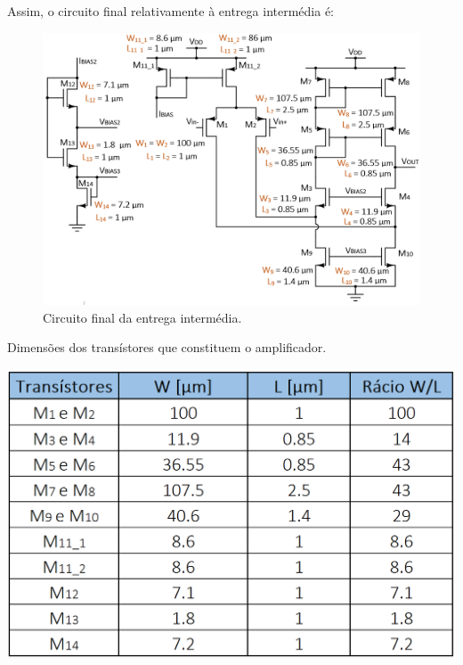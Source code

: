\documentclass[11pt]{article}
\numberwithin{equation}{section}
\begin{document}


Assim, o circuito final relativamente à entrega intermédia é:

\begin{figure}[H]
	\centering
	\includegraphics[keepaspectratio=true, scale=0.42]{teoricas/circuitoantesdadiv}
	\vspace{-0.5em}
	\caption{Circuito final da entrega intermédia.}
	\vspace{-0.8em}
	\label{fig:finalint}
\end{figure} 

\begin{table}[H]
	\centering
	\caption{Dimensões dos transístores que constituem o amplificador.}
	\vspace{-1.5mm}
	\includegraphics[keepaspectratio=true, scale=0.35]{teoricas/dimensoes1}
\end{table}
\end{document}
